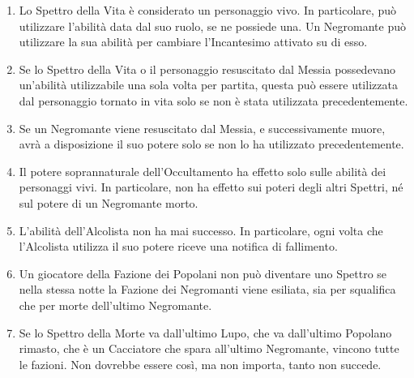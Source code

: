 \documentclass[a4paper,10pt]{article}
\begin{document}
\begin{enumerate}
	\item Lo Spettro della Vita è considerato un personaggio vivo. In particolare, può utilizzare l'abilità data dal suo ruolo, se ne possiede una. Un Negromante può utilizzare la sua abilità per cambiare l'Incantesimo attivato su di esso.
	
	\item Se lo Spettro della Vita o il personaggio resuscitato dal Messia possedevano un'abilità utilizzabile una sola volta per partita, questa può essere utilizzata dal personaggio tornato in vita solo se non è stata utilizzata precedentemente.
	
	\item Se un Negromante viene resuscitato dal Messia, e successivamente muore, avrà a disposizione il suo potere solo se non lo ha utilizzato precedentemente.
	
	\item Il potere soprannaturale dell'Occultamento ha effetto solo sulle abilità dei personaggi vivi. In particolare, non ha effetto sui poteri degli altri Spettri, né sul potere di un Negromante morto.
	
	\item L'abilità dell'Alcolista non ha mai successo. In particolare, ogni volta che l'Alcolista utilizza il suo potere riceve una notifica di fallimento.
	
	\item Un giocatore della Fazione dei Popolani non può diventare uno Spettro se nella stessa notte la Fazione dei Negromanti viene esiliata, sia per squalifica che per morte dell'ultimo Negromante.
	
	\item Se lo Spettro della Morte va dall'ultimo Lupo, che va dall'ultimo Popolano rimasto, che è un Cacciatore che spara all'ultimo Negromante, vincono tutte le fazioni. Non dovrebbe essere così, ma non importa, tanto non succede.
	
	
	

\end{enumerate}
\end{document}
